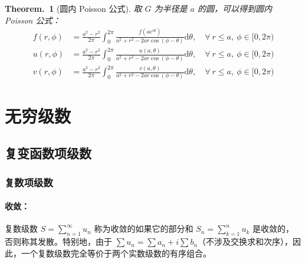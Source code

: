 \documentclass[UTF8]{report}
\theoremstyle{MyLineTheoremStyle} %
\theoremstyle{MyBlockTheoremStyle} %
\newtheorem{BlockTheorem}[LineTheorem]{Theorem.\,} %
\theoremstyle{MySubsubsectionStyle} %
\begin{document}
\begin{BlockTheorem}[圆内 Poisson 公式]\label{圆内 Poisson 公式}
取 $G$ 为半径是 $a$ 的圆，可以得到圆内 Poisson 公式：
\begin{align}
f(r, \phi)  &= \frac{a^2 - r^2}{2 \pi} \int_{0}^{2 \pi} \frac{f(ae^{i \theta})}{a^2 + r^2 - 2ar\cos(\phi - \theta)} \mathrm{d} \theta 
,\quad \forall\ r \leqslant a,\ \phi \in [0, 2\pi)
\\ 
u(r, \phi) &= \frac{a^2 - r^2}{2 \pi} \int_{0}^{2 \pi} \frac{ u(a, \theta) }{a^2 + r^2 - 2ar\cos(\phi - \theta)} \mathrm{d} \theta   
,\quad \forall\ r \leqslant a,\ \phi \in [0, 2\pi)
\\ 
v(r, \phi) &= \frac{a^2 - r^2}{2 \pi} \int_{0}^{2 \pi} \frac{ v(a, \theta) }{a^2 + r^2 - 2ar\cos(\phi - \theta)} \mathrm{d} \theta   
,\quad \forall\ r \leqslant a,\ \phi \in [0, 2\pi)
\end{align}

\end{BlockTheorem}



\chapter{无穷级数}\thispagestyle{fancy}

\section{复变函数项级数}


\subsection{复数项级数}

\subsubsection{收敛：}

复数级数 $\displaystyle S = \sum_{n = 1}^{\infty} u_n$ 称为收敛的如果它的部分和 $\displaystyle S_n = \sum_{k=1}^{n} u_k$ 是收敛的，否则称其发散。特别地，由于 $\sum u_n = \sum a_n + i\sum b_n$（不涉及交换求和次序），因此，一个复数级数完全等价于两个实数级数的有序组合。
\end{document}
